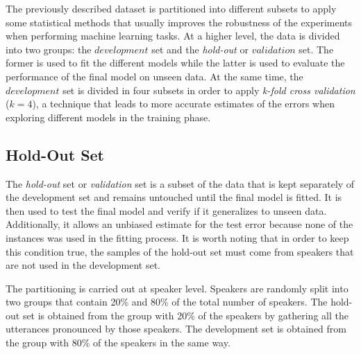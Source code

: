 
The previously described dataset is partitioned into different subsets
to apply some statistical methods that usually
improves the robustness of the experiments
when performing machine learning tasks.
At a higher level,
the data is divided into two groups: the $development$ set and the \textit{hold-out} or $validation$ set. The former is used to fit the different models while the latter is used
to evaluate the performance
of the final model on unseen data. At the same time, the $development$ set is divided in four
subsets in order to apply \textit{k-fold cross validation} ($k=4$), a
technique that leads to more accurate estimates of the errors when exploring different
models in the training phase.

\subsection{Hold-Out Set}

The \textit{hold-out} set or \textit{validation} set is a subset of the data that is kept
separately of the development set and remains untouched until the final model is fitted. It is
then used to test the final model and verify if it generalizes to unseen data.
Additionally, it allows
an unbiased estimate for the test error because none of the instances was used in the
fitting process.
It is worth noting that in order to keep this condition true, the samples
of the hold-out set must come from speakers that are not used in the development set.

The partitioning is carried out at speaker level. Speakers are randomly split into two groups
that contain 20\% and 80\% of the total number of speakers. The hold-out set
is obtained from the group with 20\% of the speakers by gathering all the utterances pronounced
by those speakers. The development set is obtained from the
group with 80\% of the speakers in the same way.
